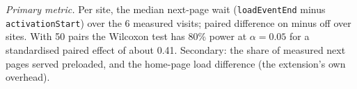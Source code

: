 \emph{Primary metric.} Per site, the median next-page wait (\texttt{loadEventEnd} minus \texttt{activationStart}) over the 6 measured visits; paired difference on minus off over sites. With 50 pairs the Wilcoxon test has 80\% power at $\alpha=0.05$ for a standardised paired effect of about 0.41. Secondary: the share of measured next pages served preloaded, and the home-page load difference (the extension's own overhead).
